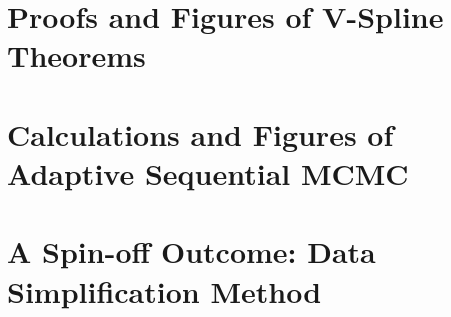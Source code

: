 \documentclass[12pt,twoside]{report}
\begin{document}
\begin{appendices}
\makeatletter
{}
\makeatother
 \chapter{Proofs and Figures of V-Spline Theorems}\label{appendTS}

 \chapter{Calculations and Figures of Adaptive Sequential MCMC}\label{appendMCMC}
  
 \chapter{A Spin-off Outcome: Data Simplification Method}\label{appendSimp}
  
\end{appendices}



\clearemptydoublepage
\end{document}
